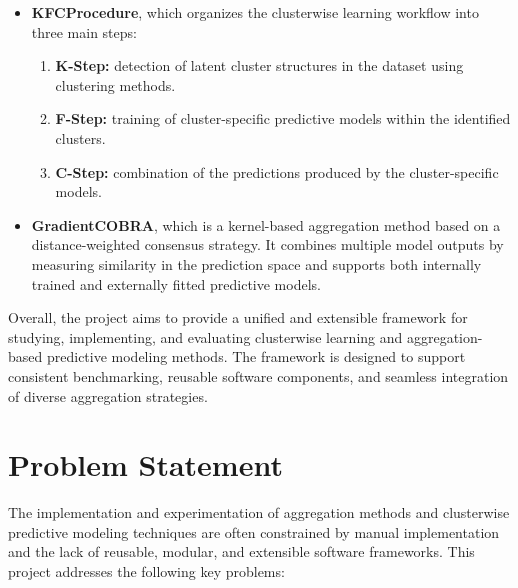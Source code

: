 \begin{itemize}        
    \item \textbf{KFCProcedure}, which organizes the clusterwise learning workflow into three main steps:
          \begin{enumerate}        
              \item \textbf{K-Step:} detection of latent cluster structures in the dataset using clustering methods.
              \item \textbf{F-Step:} training of cluster-specific predictive models within the identified clusters.
              \item \textbf{C-Step:} combination of the predictions produced by the cluster-specific models.
          \end{enumerate}
          
          
    \item \textbf{GradientCOBRA}, which is a kernel-based aggregation method based on a distance-weighted consensus strategy. It combines multiple model outputs by measuring similarity in the prediction space and supports both internally trained and externally fitted predictive models.
          
\end{itemize}

Overall, the project aims to provide a unified and extensible framework for studying, implementing, and evaluating clusterwise learning and aggregation-based predictive modeling methods. The framework is designed to support consistent benchmarking, reusable software components, and seamless integration of diverse aggregation strategies.

\section{Problem Statement}

\hs The implementation and experimentation of aggregation methods and clusterwise predictive modeling techniques are often constrained by manual implementation and the lack of reusable, modular, and extensible software frameworks. This project addresses the following key problems:

